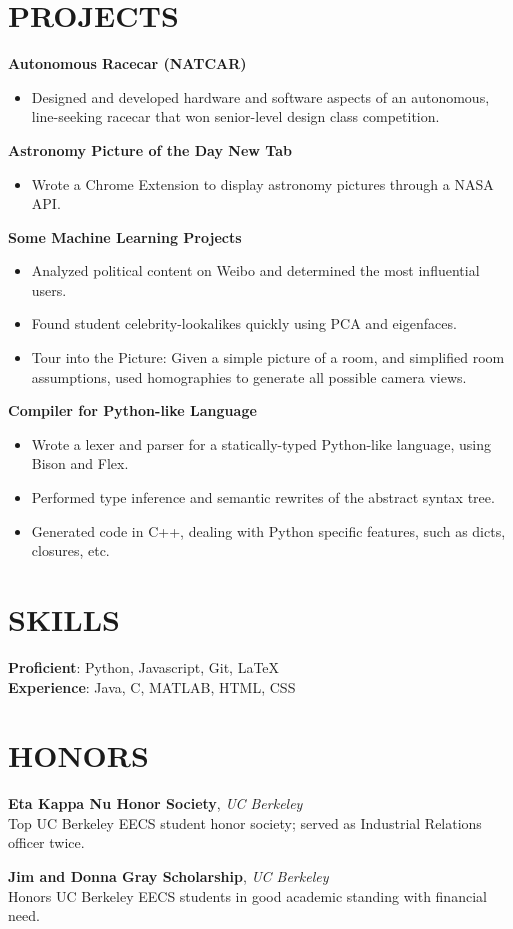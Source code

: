 \documentclass[line,margin]{res}
\begin{document}
\begin{resume}
\section{PROJECTS}
{\bf Autonomous Racecar (NATCAR)}
\begin{itemize} \itemsep - 1pt
  \item Designed and developed hardware and software aspects of an autonomous,
        line-seeking racecar that won senior-level design class competition.
\end{itemize}

{\bf Astronomy Picture of the Day New Tab}
\begin{itemize} \itemsep - 1pt
  \item Wrote a Chrome Extension to display astronomy pictures through a NASA API.
\end{itemize}

{\bf Some Machine Learning Projects}
\begin{itemize} \itemsep - 1pt
  \item Analyzed political content on Weibo and determined the most influential users.
  \item Found student celebrity-lookalikes quickly using PCA and eigenfaces.
  \item Tour into the Picture: Given a simple picture of a room, and simplified room
        assumptions, used homographies to generate all possible camera views.
\end{itemize}

{\bf Compiler for Python-like Language}
\begin{itemize} \itemsep - 1pt
  \item Wrote a lexer and parser for a statically-typed Python-like language,
      using Bison and Flex.
  \item Performed type inference and semantic rewrites of the abstract
      syntax tree.
  \item Generated code in C++, dealing with Python specific features, such as
      dicts, closures, etc.
\end{itemize}


\section{SKILLS}
{\bf Proficient}: Python, Javascript, Git, \LaTeX \\
{\bf Experience}: Java, C, MATLAB, HTML, CSS\\


\section{HONORS}
{\bf Eta Kappa Nu Honor Society}, {\it UC Berkeley}\\
Top UC Berkeley EECS student honor society; served as Industrial Relations officer twice.

{\bf Jim and Donna Gray Scholarship}, {\it UC Berkeley}\\
Honors UC Berkeley EECS students in good academic standing with financial need.

\end{resume}
\end{document}
